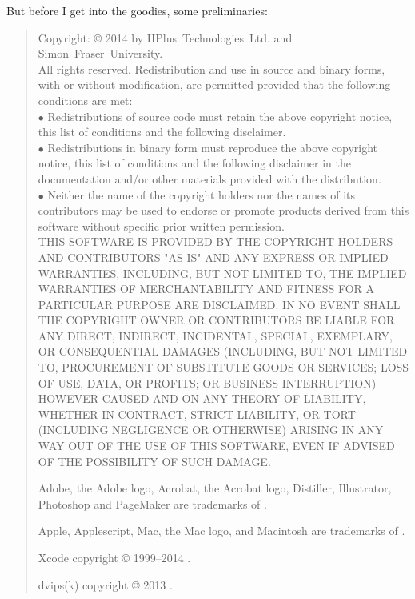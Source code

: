 But before I get into the goodies, some preliminaries:
\begin{quote}
\begin{small}
Copyright: \copyright{} 2014 by HPlus~Technologies~Ltd. and Simon~Fraser~University.
\\
All rights reserved. Redistribution and use in source and binary forms,
with or without modification, are permitted provided that the following conditions are met:\\
$\bullet$ Redistributions of source code must retain the above copyright notice,
this list of conditions and the following disclaimer.\\
$\bullet$ Redistributions in binary form must reproduce the above copyright notice,
this list of conditions and the following disclaimer in the documentation and/or other materials provided with the distribution.\\
$\bullet$ Neither the name of the copyright holders nor the names of its contributors may be used to endorse
or promote products derived from this software without specific prior written permission.\\
THIS SOFTWARE IS PROVIDED BY THE COPYRIGHT HOLDERS AND CONTRIBUTORS "AS IS" AND ANY EXPRESS OR IMPLIED WARRANTIES,
INCLUDING, BUT NOT LIMITED TO, THE IMPLIED WARRANTIES OF MERCHANTABILITY AND FITNESS FOR A PARTICULAR PURPOSE ARE DISCLAIMED.
IN NO EVENT SHALL THE COPYRIGHT OWNER OR CONTRIBUTORS BE LIABLE FOR ANY DIRECT, INDIRECT, INCIDENTAL, SPECIAL, EXEMPLARY,
OR CONSEQUENTIAL DAMAGES (INCLUDING, BUT NOT LIMITED TO, PROCUREMENT OF SUBSTITUTE GOODS OR SERVICES;
LOSS OF USE, DATA, OR PROFITS; OR BUSINESS INTERRUPTION) HOWEVER CAUSED AND ON ANY THEORY OF LIABILITY, WHETHER IN CONTRACT,
STRICT LIABILITY, OR TORT (INCLUDING NEGLIGENCE OR OTHERWISE) ARISING IN ANY WAY OUT OF THE USE OF THIS SOFTWARE,
EVEN IF ADVISED OF THE POSSIBILITY OF SUCH DAMAGE.

Adobe, the Adobe logo, Acrobat, the Acrobat logo, Distiller, Illustrator, Photoshop and PageMaker are trademarks of
.

Apple, Applescript, Mac, the Mac logo, and Macintosh are trademarks of .

Xcode copyright \copyright{} 1999--2014 .

dvips(k) copyright \copyright{} 2013 .


\end{small}
\end{quote}
